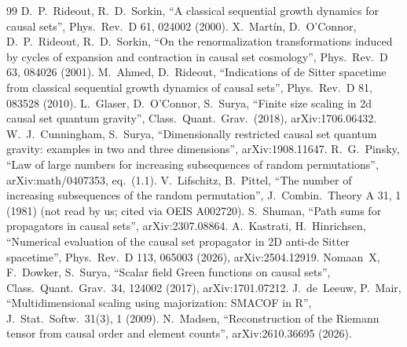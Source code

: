 \documentclass[11pt,a4paper]{article}
\begin{document}
\begin{thebibliography}{99}
 D.~P.~Rideout, R.~D.~Sorkin, ``A classical sequential growth dynamics for causal sets'', Phys.\ Rev.\ D 61, 024002 (2000).
 X.~Mart\'in, D.~O'Connor, D.~P.~Rideout, R.~D.~Sorkin, ``On the renormalization transformations induced by cycles of expansion and contraction in causal set cosmology'', Phys.\ Rev.\ D 63, 084026 (2001).
 M.~Ahmed, D.~Rideout, ``Indications of de Sitter spacetime from classical sequential growth dynamics of causal sets'', Phys.\ Rev.\ D 81, 083528 (2010).
 L.~Glaser, D.~O'Connor, S.~Surya, ``Finite size scaling in 2d causal set quantum gravity'', Class.\ Quant.\ Grav.\ (2018), arXiv:1706.06432.
 W.~J.~Cunningham, S.~Surya, ``Dimensionally restricted causal set quantum gravity: examples in two and three dimensions'', arXiv:1908.11647.
 R.~G.~Pinsky, ``Law of large numbers for increasing subsequences of random permutations'', arXiv:math/0407353, eq.~(1.1).
 V.~Lifschitz, B.~Pittel, ``The number of increasing subsequences of the random permutation'', J.\ Combin.\ Theory A 31, 1 (1981) (not read by us; cited via OEIS A002720).
 S.~Shuman, ``Path sums for propagators in causal sets'', arXiv:2307.08864.
 A.~Kastrati, H.~Hinrichsen, ``Numerical evaluation of the causal set propagator in 2D anti-de Sitter spacetime'', Phys.\ Rev.\ D 113, 065003 (2026), arXiv:2504.12919.
 Nomaan~X, F.~Dowker, S.~Surya, ``Scalar field Green functions on causal sets'', Class.\ Quant.\ Grav.\ 34, 124002 (2017), arXiv:1701.07212.
 J.~de~Leeuw, P.~Mair, ``Multidimensional scaling using majorization: SMACOF in R'', J.\ Stat.\ Softw.\ 31(3), 1 (2009).
 N.~Madsen, ``Reconstruction of the Riemann tensor from causal order and element counts'', arXiv:2610.36695 (2026).
\end{thebibliography}
\end{document}
